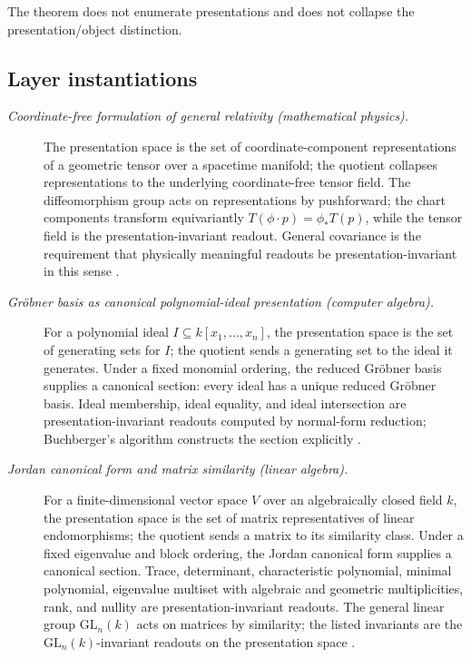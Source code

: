 \documentclass[11pt]{article}
\theoremstyle{definition}
\begin{document}
The theorem does not enumerate presentations and does not collapse
the presentation/object distinction.

\subsection*{Layer instantiations}\label{layer-inst:F29}

\begin{description}
\item[\emph{Coordinate-free formulation of general
relativity (mathematical physics).}]
The presentation space is the set of
coordinate-component representations of a geometric
tensor over a spacetime manifold; the quotient
collapses representations to the underlying
coordinate-free tensor field.  The diffeomorphism
group acts on representations by pushforward; the
chart components transform equivariantly
\(T(\phi\cdot p)=\phi_*T(p)\), while the tensor field
is the presentation-invariant readout.  General
covariance is the requirement that physically
meaningful readouts be presentation-invariant in this
sense \citep{MisnerThorneWheeler1973Gravitation}.

\item[\emph{Gr\"obner basis as canonical
polynomial-ideal presentation (computer algebra).}]
For a polynomial ideal \(I\subseteq k[x_1,\dots,x_n]\),
the presentation space is the set of generating sets
for \(I\); the quotient sends a generating set to the
ideal it generates.  Under a fixed monomial ordering,
the reduced Gr\"obner basis supplies a canonical
section: every ideal has a unique reduced Gr\"obner
basis.  Ideal membership, ideal equality, and ideal
intersection are presentation-invariant readouts
computed by normal-form reduction; Buchberger's
algorithm constructs the section explicitly
\citep{Buchberger1965ThesisGroebner}.

\item[\emph{Jordan canonical form and matrix similarity
(linear algebra).}]
For a finite-dimensional vector space \(V\) over an
algebraically closed field \(k\), the presentation
space is the set of matrix representatives of linear
endomorphisms; the quotient sends a matrix to its
similarity class.  Under a fixed eigenvalue and
block ordering, the Jordan canonical form supplies a
canonical section.  Trace, determinant, characteristic
polynomial, minimal polynomial, eigenvalue multiset
with algebraic and geometric multiplicities, rank, and
nullity are presentation-invariant readouts.  The
general linear group \(\mathrm{GL}_n(k)\) acts on
matrices by similarity; the listed invariants are the
\(\mathrm{GL}_n(k)\)-invariant readouts on the
presentation space \citep{HoffmanKunze1971LinearAlgebra}.


\end{description}
\end{document}
